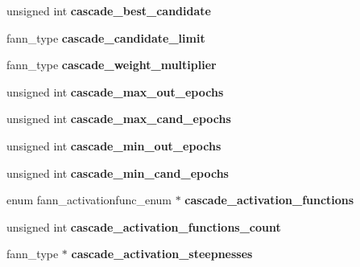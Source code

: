 \begin{DoxyCompactItemize}
\item 
\hypertarget{structfann_aed1c473cb2280c4a32e47005b1f569cf}{unsigned int {\bfseries cascade\-\_\-best\-\_\-candidate}}\label{structfann_aed1c473cb2280c4a32e47005b1f569cf}

\item 
\hypertarget{structfann_a3fe12e1598b871496ff1500a2ef1a3b8}{fann\-\_\-type {\bfseries cascade\-\_\-candidate\-\_\-limit}}\label{structfann_a3fe12e1598b871496ff1500a2ef1a3b8}

\item 
\hypertarget{structfann_af6c238d32a1bcd3361ec213e6c135948}{fann\-\_\-type {\bfseries cascade\-\_\-weight\-\_\-multiplier}}\label{structfann_af6c238d32a1bcd3361ec213e6c135948}

\item 
\hypertarget{structfann_ae1ddcea82d5a099d5a60a45159ff2d09}{unsigned int {\bfseries cascade\-\_\-max\-\_\-out\-\_\-epochs}}\label{structfann_ae1ddcea82d5a099d5a60a45159ff2d09}

\item 
\hypertarget{structfann_a6e2f1a1d3cd054c4e69bb81f7c37b11c}{unsigned int {\bfseries cascade\-\_\-max\-\_\-cand\-\_\-epochs}}\label{structfann_a6e2f1a1d3cd054c4e69bb81f7c37b11c}

\item 
\hypertarget{structfann_a8d821adc6aa551f7abde66d252e72499}{unsigned int {\bfseries cascade\-\_\-min\-\_\-out\-\_\-epochs}}\label{structfann_a8d821adc6aa551f7abde66d252e72499}

\item 
\hypertarget{structfann_ad11f22fdbbfbc328a171c85c66f761a7}{unsigned int {\bfseries cascade\-\_\-min\-\_\-cand\-\_\-epochs}}\label{structfann_ad11f22fdbbfbc328a171c85c66f761a7}

\item 
\hypertarget{structfann_a0a4c98526fec0906e040f2621c3fe34c}{enum fann\-\_\-activationfunc\-\_\-enum $\ast$ {\bfseries cascade\-\_\-activation\-\_\-functions}}\label{structfann_a0a4c98526fec0906e040f2621c3fe34c}

\item 
\hypertarget{structfann_a7c88eae51cbc9362c2f186a36cbfb5da}{unsigned int {\bfseries cascade\-\_\-activation\-\_\-functions\-\_\-count}}\label{structfann_a7c88eae51cbc9362c2f186a36cbfb5da}

\item 
\hypertarget{structfann_ab9bc5090489f89664834fb6f7afc7fbe}{fann\-\_\-type $\ast$ {\bfseries cascade\-\_\-activation\-\_\-steepnesses}}\label{structfann_ab9bc5090489f89664834fb6f7afc7fbe}


\end{DoxyCompactItemize}
